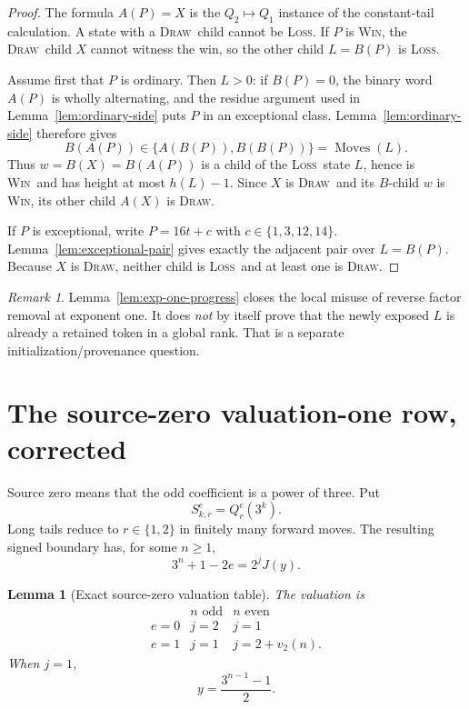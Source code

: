 \documentclass[11pt,a4paper]{article}
\newtheorem{lemma}[theorem]{Lemma}
\theoremstyle{definition}
\theoremstyle{remark}
\newtheorem{remark}[theorem]{Remark}
\newcommand{\WIN}{\textnormal{\textsc{Win}}}
\newcommand{\LOSS}{\textnormal{\textsc{Loss}}}
\newcommand{\DRAW}{\textnormal{\textsc{Draw}}}
\newcommand{\Moves}{\operatorname{Moves}}
\begin{document}
\begin{proof}
The formula $A(P)=X$ is the $Q_2\mapsto Q_1$ instance of the constant-tail
calculation.  A state with a \DRAW\ child cannot be \LOSS.  If $P$ is
\WIN, the \DRAW\ child $X$ cannot witness the win, so the other child
$L=B(P)$ is \LOSS.

Assume first that $P$ is ordinary.  Then $L>0$: if $B(P)=0$, the
binary word $A(P)$ is wholly alternating, and the residue argument used in
Lemma~\ref{lem:ordinary-side} puts $P$ in an exceptional class.
Lemma~\ref{lem:ordinary-side} therefore gives
\[
 B(A(P))\in\{A(B(P)),B(B(P))\}=\Moves(L).
\]
Thus $w=B(X)=B(A(P))$ is a child of the \LOSS\ state $L$, hence is \WIN\
and has height at most $h(L)-1$.  Since $X$ is \DRAW\ and its $B$-child
$w$ is \WIN, its other child $A(X)$ is \DRAW.

If $P$ is exceptional, write $P=16t+c$ with
$c\in\{1,3,12,14\}$.  Lemma~\ref{lem:exceptional-pair} gives exactly the adjacent pair over $L=B(P)$.
Because $X$ is \DRAW, neither child is \LOSS\ and at least one is \DRAW.
\end{proof}

\begin{remark}
Lemma~\ref{lem:exp-one-progress} closes the local misuse of reverse factor
removal at exponent one.  It does \emph{not} by itself prove that the newly
exposed $L$ is already a retained token in a global rank.  That is a
separate initialization/provenance question.
\end{remark}

\section{The source-zero valuation-one row, corrected}

Source zero means that the odd coefficient is a power of three.  Put
\[
  S_{k,r}^e=Q_r^e(3^k).
\]
Long tails reduce to $r\in\{1,2\}$ in finitely many forward moves.  The
resulting signed boundary has, for some $n\ge1$,
\[
  3^n+1-2e=2^j J(y).
\]

\begin{lemma}[Exact source-zero valuation table]\label{lem:zero-table}
The valuation is
\[
\begin{array}{c|cc}
 &n\text{ odd}&n\text{ even}\\ \hline
 e=0&j=2&j=1\\
 e=1&j=1&j=2+v_2(n).
\end{array}
\]
When $j=1$,
\[
  y=\frac{3^{n-1}-1}{2}.
\]
\end{lemma}
\end{document}
